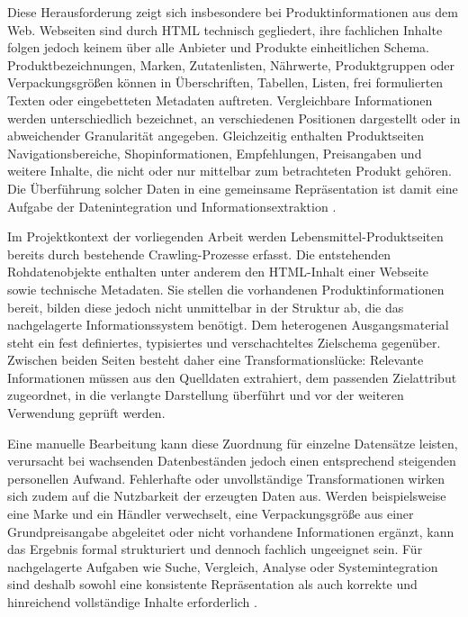 Diese Herausforderung zeigt sich insbesondere bei Produktinformationen aus dem Web. Webseiten sind durch HTML technisch gegliedert, ihre fachlichen Inhalte folgen jedoch keinem über alle Anbieter und Produkte einheitlichen Schema. Produktbezeichnungen, Marken, Zutatenlisten, Nährwerte, Produktgruppen oder Verpackungsgrößen können in Überschriften, Tabellen, Listen, frei formulierten Texten oder eingebetteten Metadaten auftreten. Vergleichbare Informationen werden unterschiedlich bezeichnet, an verschiedenen Positionen dargestellt oder in abweichender Granularität angegeben. Gleichzeitig enthalten Produktseiten Navigationsbereiche, Shopinformationen, Empfehlungen, Preisangaben und weitere Inhalte, die nicht oder nur mittelbar zum betrachteten Produkt gehören. Die Überführung solcher Daten in eine gemeinsame Repräsentation ist damit eine Aufgabe der Datenintegration und Informationsextraktion \cite{doan2012principles,ferrara2014web}.

Im Projektkontext der vorliegenden Arbeit werden Lebensmittel-Produktseiten bereits durch bestehende Crawling-Prozesse erfasst. Die entstehenden Rohdatenobjekte enthalten unter anderem den HTML-Inhalt einer Webseite sowie technische Metadaten. Sie stellen die vorhandenen Produktinformationen bereit, bilden diese jedoch nicht unmittelbar in der Struktur ab, die das nachgelagerte Informationssystem benötigt. Dem heterogenen Ausgangsmaterial steht ein fest definiertes, typisiertes und verschachteltes Zielschema gegenüber. Zwischen beiden Seiten besteht daher eine Transformationslücke: Relevante Informationen müssen aus den Quelldaten extrahiert, dem passenden Zielattribut zugeordnet, in die verlangte Darstellung überführt und vor der weiteren Verwendung geprüft werden.

Eine manuelle Bearbeitung kann diese Zuordnung für einzelne Datensätze leisten, verursacht bei wachsenden Datenbeständen jedoch einen entsprechend steigenden personellen Aufwand. Fehlerhafte oder unvollständige Transformationen wirken sich zudem auf die Nutzbarkeit der erzeugten Daten aus. Werden beispielsweise eine Marke und ein Händler verwechselt, eine Verpackungsgröße aus einer Grundpreisangabe abgeleitet oder nicht vorhandene Informationen ergänzt, kann das Ergebnis formal strukturiert und dennoch fachlich ungeeignet sein. Für nachgelagerte Aufgaben wie Suche, Vergleich, Analyse oder Systemintegration sind deshalb sowohl eine konsistente Repräsentation als auch korrekte und hinreichend vollständige Inhalte erforderlich \cite{wang1996beyond,batini2016data}.

